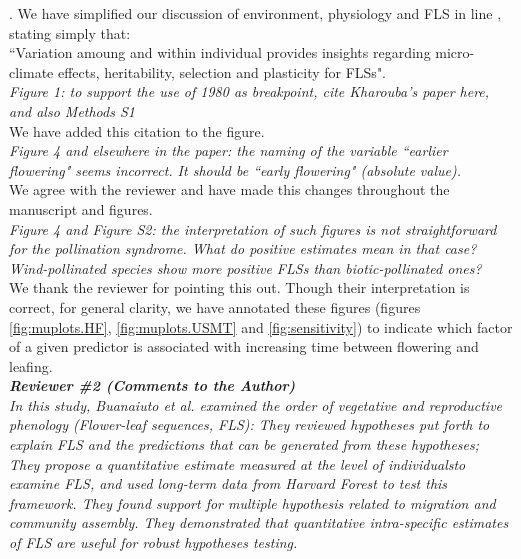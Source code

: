 \documentclass{article}[11pt]
\begin{document}
\noindent . We have simplified our discussion of environment, physiology and FLS in line , stating simply that:\\
\indent ``Variation amoung and within individual provides insights regarding  micro-climate effects, heritability, selection and plasticity for FLSs".\\

\emph{Figure 1: to support the use of 1980 as breakpoint, cite Kharouba's paper here, and also Methods S1}\\

\noindent We have added this citation to the figure.\\

\emph{Figure 4 and elsewhere in the paper: the naming of the variable ``earlier flowering" seems incorrect. It should be ``early flowering" (absolute value).}\\

\noindent We agree with the reviewer and have made this changes throughout the manuscript and figures.\\

\emph{Figure 4 and Figure S2: the interpretation of such figures is not straightforward for the pollination syndrome. What do positive estimates mean in that case? Wind-pollinated species show more positive FLSs than biotic-pollinated ones?}\\

\noindent We thank the reviewer for pointing this out. Though their interpretation is correct, for general clarity, we have annotated these figures (figures \ref{fig:muplots.HF}, \ref{fig:muplots.USMT} and \ref{fig:sensitivity}) to indicate which factor of a given predictor is associated with increasing time between flowering and leafing.\\

\emph{{\bf Reviewer \#2 (Comments to the Author)}}\\

\emph{In this study, Buanaiuto et al. examined the order of vegetative and reproductive phenology (Flower-leaf sequences, FLS): They reviewed hypotheses put forth to explain FLS and the predictions that can be generated from these hypotheses; They propose a  quantitative estimate measured at the level of individualsto examine FLS, and used long-term data from Harvard Forest to test this framework. They found support for multiple hypothesis related to migration and community assembly. They demonstrated that quantitative intra-specific estimates of FLS are useful for robust hypotheses testing.}\\
\end{document}
